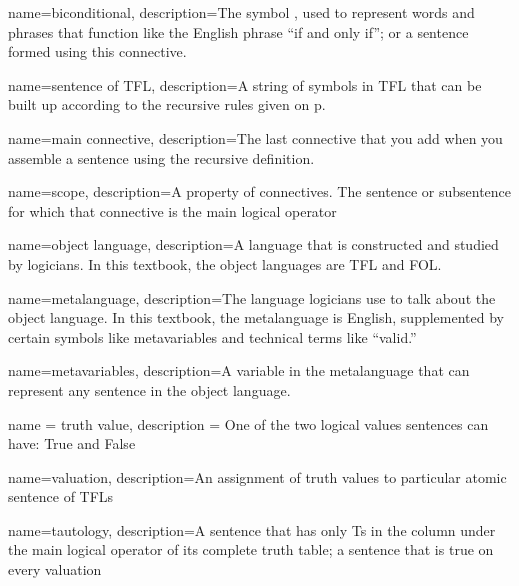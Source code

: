 {
name=biconditional,
description={The symbol \eiff, used to represent words and phrases that function like the English phrase ``if and only if''; or a sentence formed using this connective.}
}



{
name=sentence of TFL,
description={A string of symbols in TFL that can be built up according to the recursive rules given on p.~\pageref{TFLsentences}}
}


{
name=main connective,
description={The last connective that you add when you assemble a sentence using the recursive definition.}
}


{
name=scope,
description={A property of connectives. The sentence or subsentence for which that connective is the main logical operator}
}





{
name=object language,
description={A language that is constructed and studied by logicians. In this textbook,
 the object languages are TFL and FOL.}
}

{
name=metalanguage,
description={The language logicians use to talk about the object language. In this textbook, the metalanguage is English, supplemented by certain symbols like metavariables and technical terms like ``valid.''}
}

{
name=metavariables,
description={A variable in the metalanguage that can represent any sentence in the object language.}
}



{
name = truth value,
description = {One of the two logical values sentences can have: True and False}
}



{
name=valuation,
description={An assignment of \glspl{truth value} to particular atomic \glspl{sentence of TFL}}
}



{
name=tautology,
description={A sentence that has only Ts in the column under the main logical operator of its \gls{complete truth table}; a sentence that is true on every \gls{valuation}}
}

